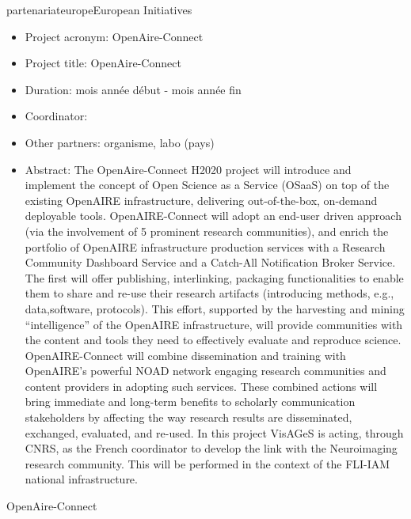 \documentclass{ra2018}
\begin{document}
\begin{module}{partenariat}{europe}{European Initiatives}
\begin{itemize}
        \item Project acronym: OpenAire-Connect
        \item Project title: OpenAire-Connect
        \item Duration: mois ann\'ee d\'ebut - mois ann\'ee fin
        \item Coordinator:
        \item Other partners: organisme, labo (pays)
        \item Abstract:  The OpenAire-Connect H2020 project will introduce and implement the concept of Open Science as a Service (OSaaS) on top of the existing OpenAIRE infrastructure, delivering out-of-the-box, on-demand deployable tools. OpenAIRE-Connect will adopt an end-user driven approach (via the involvement of 5 prominent research communities), and enrich the portfolio of OpenAIRE infrastructure production services with a Research Community Dashboard Service and a Catch-All Notification Broker Service. The first will offer publishing, interlinking, packaging functionalities to enable them to share and re-use their research artifacts (introducing methods, e.g., data,software, protocols). This effort, supported by the harvesting and mining “intelligence” of the OpenAIRE infrastructure, will provide communities with the content and tools they need to effectively evaluate and reproduce science. OpenAIRE-Connect will combine dissemination and training with OpenAIRE's powerful NOAD network engaging research communities and content providers in adopting such services. These combined actions will bring immediate and long-term benefits to scholarly communication stakeholders by affecting the way research results are disseminated, exchanged, evaluated, and re-used. In this project VisAGeS is acting, through CNRS, as the French coordinator to develop the link with the Neuroimaging research community. This will be performed in the context of the FLI-IAM national infrastructure.
\end{itemize}

OpenAire-Connect


\end{module}
\end{document}

